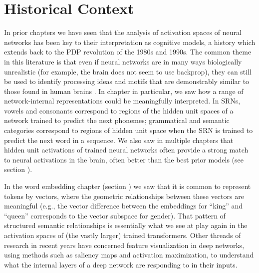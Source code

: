 
\section{Historical Context}\label{mechInterpHist}

In prior chapters we have seen that the analysis of activation spaces of neural
networks has been key to their interpretation as cognitive models, a history
which extends back to the PDP revolution of the 1980s and 1990s. The common
theme in this literature is that even if neural networks are in many ways
biologically unrealistic (for example, the brain does not seem to use
backprop), they can still be used to identify processing ideas and motifs that
are demonstrably similar to those found in human brains
\cite{zipser1992identification}. In chapter  in
particular, we saw how a range of network-internal representations could be
meaningfully interpreted. In SRNs, vowels and consonants correspond to regions
of the hidden unit spaces of a network trained to predict the next phonemes;
grammatical and semantic categories correspond to regions of hidden unit space
when the SRN is trained to predict the next word in a sequence. We also saw in
multiple chapters that hidden unit activations of trained neural networks often
provide a strong match to neural activations in the brain, often better than
the best prior models (see section ).

In the word embedding chapter (section ) we saw
that it is common to represent tokens by vectors, where the geometric
relationships between these vectors are meaningful (e.g., the vector difference
between the embeddings for ``king'' and ``queen'' corresponds to the vector
subspace for gender). That pattern of structured semantic relationships is
essentially what we see at play again in the activation spaces of (the vastly
larger) trained transformers. Other threads of research in recent years have
concerned feature visualization in deep networks, using methods such as
saliency maps and activation maximization, to understand what the internal
layers of a deep network are responding to in their inputs.


